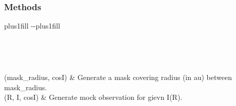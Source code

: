 \documentclass[a4paper,11pt,english]{sphinxmanual}
\begin{document}
\begin{fulllineitems}
\begin{fulllineitems}
\end{fulllineitems}



\begin{fulllineitems}

\pysigstartsignatures
\pysigline
{}
\pysigstopsignatures
\end{fulllineitems}

\subsubsection*{Methods}


\begin{savenotes}
\sphinxatlongtablestart
\sphinxthistablewithglobalstyle
\sphinxthistablewithnovlinesstyle
\makeatletter
  \LTleft \@totalleftmargin plus1fill
  \LTright\dimexpr\columnwidth-\@totalleftmargin-\linewidth\relax plus1fill
\makeatother
\begin{longtable}{}
\sphinxtoprule
\endfirsthead

\\
\sphinxtoprule
\endhead

\sphinxbottomrule
{}\\
\endfoot

\endlastfoot
\sphinxtableatstartofbodyhook

\sphinxAtStartPar
{\hyperref[\detokenize{x22:disk_model.DiskImage.generate_mask}]{}}(mask\_radius, cosI)
&
\sphinxAtStartPar
Generate a mask covering radius (in au) between mask\_radius.
\\
\sphinxhline
\sphinxAtStartPar
{\hyperref[\detokenize{x22:disk_model.DiskImage.generate_mock_observation}]{}}(R, I, cosI)
&
\sphinxAtStartPar
Generate mock observation for gievn I(R).
\\
\sphinxbottomrule
\end{longtable}
\sphinxtableafterendhook
\sphinxatlongtableend
\end{savenotes}



\end{fulllineitems}
\end{document}
